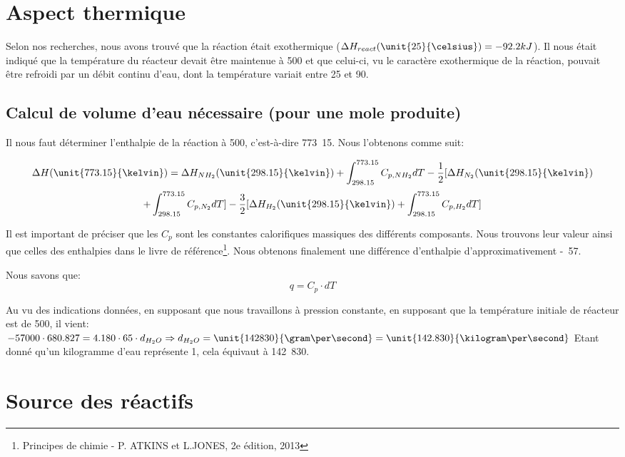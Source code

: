 \documentclass[11pt,a4paper]{report}
\begin{document}
\section*{Aspect thermique}
Selon nos recherches, nous avons trouvé que la réaction était exothermique ($\Delta H_{react}(\unit{25}{\celsius}) = -92.2kJ$).
Il nous était indiqué que la température du réacteur devait être maintenue à \unit{500}{\celsius} et que celui-ci, 
vu le caractère exothermique de la réaction, pouvait être refroidi par un débit continu d'eau, dont la température 
variait entre \unit{25}{\celsius} et \unit{90}{\celsius}.

\subsection*{Calcul de volume d'eau nécessaire (pour une mole produite)}

Il nous faut déterminer l'enthalpie de la réaction à \unit{500}{\celsius}, c'est-à-dire \unit{773.15}{\kelvin}.
Nous l'obtenons comme suit:

$$\Delta H(\unit{773.15}{\kelvin}) = \Delta H_{NH_2}(\unit{298.15}{\kelvin}) + \int_{298.15}^{773.15} C_{p, NH_2} dT 
 - \frac{1}{2} \lbrack \Delta H_{N_2}(\unit{298.15}{\kelvin}) $$ 
$$+ \int_{298.15}^{773.15} C_{p, N_2} dT \rbrack - \frac{3}{2}  \lbrack \Delta H_{H_2}(\unit{298.15}{\kelvin}) + \int_{298.15}^{773.15} C_{p, H_2} dT  \rbrack $$

Il est important de préciser que les $C_{p}$ sont les constantes calorifiques massiques des différents composants. 
Nous trouvons leur valeur ainsi que celles des enthalpies dans le livre de référence\footnote{Principes de chimie - P. ATKINS et L.JONES, 2e édition, 2013}.
Nous obtenons finalement une différence d'enthalpie d'approximativement \unit{-57}{\kilo\joule}.

Nous savons que:
$$q =  C_p \cdot dT$$

Au vu des indications données, en supposant que nous travaillons à pression constante, en supposant que la température initiale de
réacteur est de \unit{500}{\celsius}, il vient:
$-57000 \cdot 680.827 = 4.180 \cdot 65 \cdot d_{H_{2}O} \Rightarrow  d_{H_{2}O} = \unit{142830}{\gram\per\second} = \unit{142.830}{\kilogram\per\second}$
Etant donné qu'un kilogramme d'eau représente \unit{1}{\liter}, cela équivaut à  \unit{142.830}{\liter\per\second}.

\section*{Source des réactifs}
\end{document}
